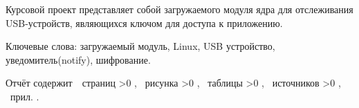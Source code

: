\Referat

\hfill

Курсовой проект представляет собой загружаемого модуля ядра для отслеживания USB-устройств, являющихся ключом для доступа к приложению.

Ключевые слова: загружаемый модуль, Linux, USB устройство, уведомитель(notify), шифрование. 

Отчёт содержит \pageref{LastPage}\,~страниц%
    \ifnum \totfig >0
    , \totfig~рисунка%
    \fi
    \ifnum \tottab >0
    , \tottab~таблицы%
    \fi
    \ifnum \totbib >0
    , \totbib~источников%
    \fi
    \ifnum \totapp >0
    , \totapp~прил.%
    \else
    .%
    \fi

